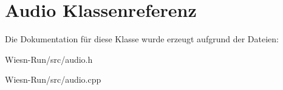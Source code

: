 \hypertarget{classAudio}{\section{Audio Klassenreferenz}
\label{classAudio}
}


Die Dokumentation für diese Klasse wurde erzeugt aufgrund der Dateien\-:\begin{DoxyCompactItemize}
\item 
Wiesn-\/\-Run/src/audio.\-h\item 
Wiesn-\/\-Run/src/audio.\-cpp\end{DoxyCompactItemize}
